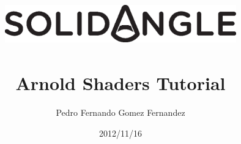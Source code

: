 \documentclass[12pt,a4paper,titlepage]{article}
\begin{document}
\renewcommand{\listingscaption}{Example}
\renewcommand{\theFancyVerbLine}{\sffamily\textcolor[rgb]{0.5,0.5,0.5}{\scriptsize\arabic{FancyVerbLine}}}

\title{\includegraphics[width=10cm]{SOLID_ANGLE_logotipo.eps}\\ \colorbox{white}{} \\ \bfseries\huge Arnold Shaders Tutorial}
\author{Pedro Fernando Gomez Fernandez}
\date{2012/11/16}
\maketitle

\tableofcontents
\newpage

\setcounter{page}{1}








\end{document}
